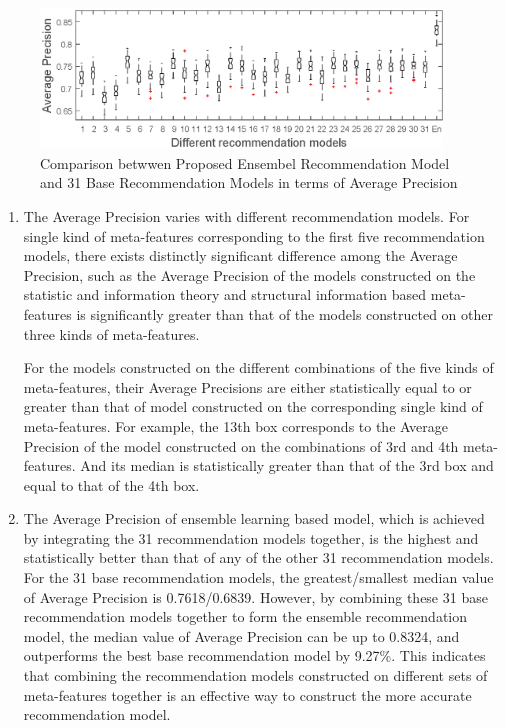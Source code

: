 \documentclass[acmsmall]{acmart}
\begin{document}
\begin{figure}[!h]
	\centering
	\includegraphics[width=0.95\textwidth]{Figures/MeanPrecisionComparison}
	\caption{Comparison betwwen Proposed Ensembel Recommendation Model and 31 Base Recommendation Models in terms of Average Precision}\label{Fig:CompOnMeanPrecision}
\end{figure}
\begin{enumerate}
	\item The Average Precision varies with different recommendation
	models. For single kind of meta-features corresponding to the
	first five recommendation models, there exists distinctly
	significant difference among the Average Precision, such as the
	Average Precision of the models constructed on the statistic and
	information theory and structural information based
	meta-features is significantly greater than that of the models
	constructed on other three kinds of meta-features.
	
	\quad For the models constructed on the different combinations
	of the five kinds of meta-features, their Average Precisions are
	either statistically equal to or greater than that of model
	constructed on the corresponding single kind of meta-features.
	For example, the 13th box corresponds to the Average Precision
	of the model constructed on the combinations of  3rd and 4th
	meta-features. And its median is statistically greater than that of the 3rd box and equal to that of the 4th box.
	
	\item The Average Precision of ensemble learning based model, which is
	achieved by integrating the 31 recommendation models together, is the
	highest and statistically better than that of any of the other 31
	recommendation models. For the 31 base recommendation models, the
	greatest/smallest median value of Average Precision is 0.7618/0.6839.
	However, by combining these 31 base recommendation models together
	to form the ensemble recommendation model, the median value of
	Average Precision can be up to 0.8324, and outperforms the best base
	recommendation model by 9.27\%. This indicates that combining the
	recommendation models constructed on different sets of
	meta-features together is an effective way to construct the more accurate
	recommendation model.
\end{enumerate}
\end{document}

